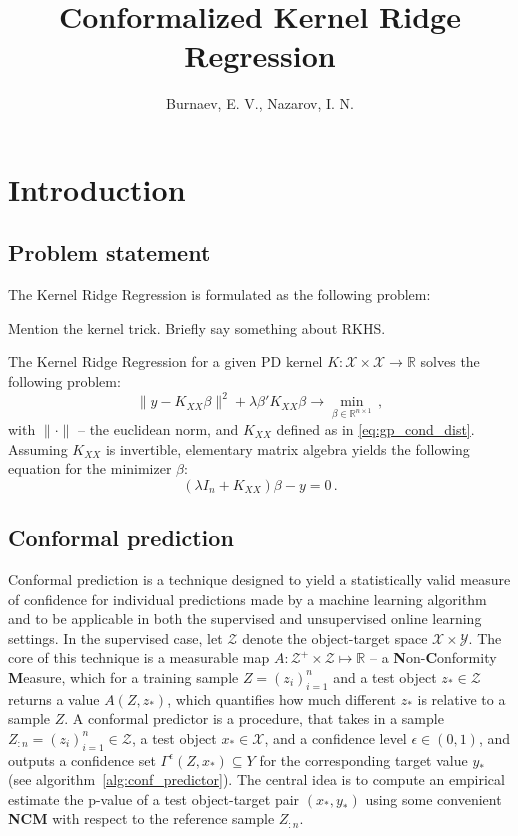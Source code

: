 \documentclass[a4paper,14pt]{extarticle}
\title{Conformalized Kernel Ridge Regression}
\author{Burnaev, E. V., Nazarov, I. N.}
\newcommand{\Xcal}{\mathcal{X}}
\newcommand{\Ycal}{\mathcal{Y}}
\newcommand{\Zcal}{\mathcal{Z}}
\newcommand{\Real}{\mathbb{R}}
\begin{document}
\maketitle

\section{Introduction} %
\label{sec:introduction}

\subsection{Problem statement} %
\label{sub:problem_statement}

The Kernel Ridge Regression is formulated as the following problem:

Mention the kernel trick.
Briefly say something about RKHS.

The Kernel Ridge Regression for a given PD kernel $K:\Xcal\times \Xcal \to \Real$
solves the following problem:
\begin{equation*}
  \|y - K_{XX}\beta\|^2 + \lambda \beta' K_{XX} \beta
    \to \min_{\beta\in \Real^{n\times 1}}
    \,,
\end{equation*}
with $\|\cdot\|$ -- the euclidean norm, and $K_{XX}$ defined as in \ref{eq:gp_cond_dist}.
Assuming $K_{XX}$ is invertible, elementary matrix algebra yields the following
equation for the minimizer $\beta$:
\begin{equation*}
  (\lambda I_n + K_{XX}) \beta - y = 0 \,.
\end{equation*}


\subsection{Conformal prediction} %
\label{sub:conformal_prediction}

Conformal prediction is a technique designed to yield a statistically valid measure
of confidence for individual predictions made by a machine learning algorithm and
to be applicable in both the supervised and unsupervised online learning settings.
In the supervised case, let $\Zcal$ denote the object-target space $\Xcal \times \Ycal$.
The core of this technique is a measurable map $A: \Zcal^+\times \Zcal \mapsto \Real$
-- a \textbf{N}on-\textbf{C}onformity \textbf{M}easure, which for a training sample
$Z = (z_i)_{i=1}^n$ and a test object $z_*\in \Zcal$ returns a value $A(Z, z_*)$,
which quantifies how much different $z_*$ is relative to a sample $Z$. A conformal
predictor is a procedure, that takes in a sample $Z_{:n}=(z_i)_{i=1}^n\in\Zcal$,
a test object $x_*\in\Xcal$, and a confidence level $\epsilon\in(0,1)$, and outputs
a confidence set $\Gamma^\epsilon(Z, x_*) \subseteq Y$ for the corresponding target
value $y_*$ (see algorithm~\ref{alg:conf_predictor}). The central idea is to compute
an empirical estimate the p-value of a test object-target pair $(x_*, y_*)$ using
some convenient \textbf{NCM} with respect to the reference sample $Z_{:n}$.
\end{document}
